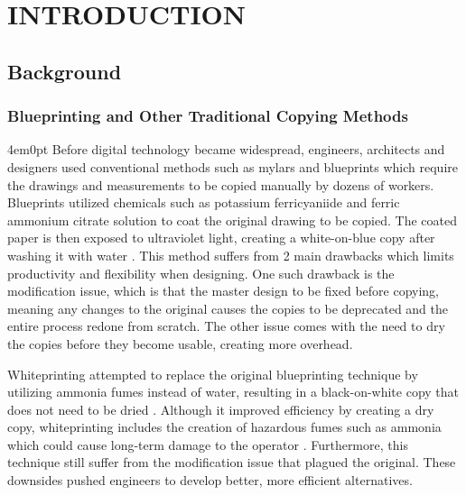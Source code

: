 \renewcommand{\thechapter}{\Roman{chapter}}
\chapter[]{INTRODUCTION}
\renewcommand{\thechapter}{\arabic{chapter}}

\begingroup
\fontsize{12bp}{\baselineskip}\selectfont

\section{Background}
	\subsection{Blueprinting and Other Traditional Copying Methods}
		\begin{indentedblock}{4em}{0pt}
			Before digital technology became widespread, engineers, architects and designers used conventional methods such as mylars and blueprints which require the drawings and measurements to be copied manually by dozens of workers. Blueprints utilized chemicals such as potassium ferricyaniide and ferric ammonium citrate solution to coat the original drawing to be copied. The coated paper is then exposed to ultraviolet light, creating a white-on-blue copy after washing it with water \parencite{blueprint_herschel}. 
			This method suffers from 2 main drawbacks which limits productivity and flexibility when designing. One such drawback is the modification issue, which is that the master design to be fixed before copying, meaning any changes to the original causes the copies to be deprecated and the entire process redone from scratch. The other issue comes with the need to dry the copies before they become usable, creating more overhead. 
			
			
			Whiteprinting attempted to replace the original blueprinting technique by utilizing ammonia fumes instead of water, resulting in a black-on-white copy that does not need to be dried \parencite{whiteprint_parmeggiani}. Although it improved efficiency by creating a dry copy, whiteprinting includes the creation of hazardous fumes such as ammonia which could cause long-term damage to the operator \parencite{whiteprint_hazards_mcglothlin}. Furthermore, this technique still suffer from the modification issue that plagued the original. These downsides pushed engineers to develop better, more efficient alternatives.
		\end{indentedblock}	
